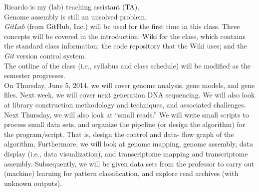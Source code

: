 Ricardo is my (lab) teaching assistant (TA). \\ 

Genome assembly is still an unsolved problem. \\

{\it GitLab} (from GitHub, Inc.) will be used for the first time in this class. Three concepts will be covered in the introduction: Wiki for the class, which contains the standard class information; the code repository that the Wiki uses; and the {\it Git} version control system. \\

The outline of the class (i.e., syllabus and class schedule) will be modified as the semester progresses. \\

On Thursday, June 5, 2014, we will cover genome analysis, gene models, and gene files. Next week, we will cover next generation DNA sequencing. We will also look at library construction methodology and techniques, and associated challenges. Next Thursday, we will also look at ``small reads.'' We will write small scripts to process small data sets, and organize the pipeline (or design the algorithm) for the program/script. That is, design the control and data- flow graph of the algorithm. Furthermore, we will look at genome mapping, genome assembly, data display (i.e., data visualization), and transcriptome mapping and transcriptome assembly. Subsequently, we will be given data sets from the professor to carry out (machine) learning for pattern classification, and explore read archives (with unknown outputs). \\




